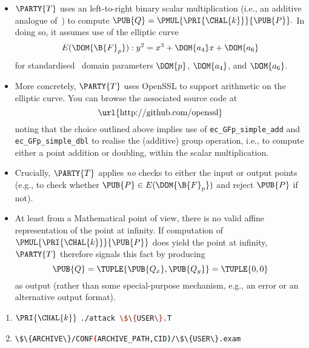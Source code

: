\begin{itemize}
\item $\PARTY{T}$ 
      uses an left-to-right binary scalar multiplication
      (i.e., an additive analogue of~\cite[Section 2.1]{SCALE:Gordon:85}) 
      to compute 
      $
      \PUB{Q} = \PMUL{\PRI{\CHAL{k}}}{\PUB{P}} .
      $
      In doing so, it assumes use of the
       elliptic curve
      \[
      E( \DOM{\B{F}_p} ) : y^2 = x^3 + \DOM{a_4} x + \DOM{a_6}
      \]
      for standardised~\cite{SCALE:FIPS:186:00} domain parameters 
      $\DOM{p}$, 
      $\DOM{a_4}$, 
      and 
      $\DOM{a_6}$.
\item More concretely, 
      $\PARTY{T}$ 
      uses OpenSSL to support arithmetic on the elliptic curve.  You can 
      browse the associated source code at
      \[
      \mbox{\url{http://github.com/openssl}}
      \]
      noting that the choice outlined above implies use of 
      \lstinline[language={C}]{ec_GFp_simple_add}
      and
      \lstinline[language={C}]{ec_GFp_simple_dbl}
      to realise the (additive) group operation, i.e., to compute either a
      point addition or doubling, within the scalar multiplication.
\item Crucially, 
      $\PARTY{T}$ 
      applies {\em no} checks to either the input or output points (e.g., to check whether $\PUB{P} \in E( \DOM{\B{F}_p} )$ and reject $\PUB{P}$ if not).
\item At least from a Mathematical point of view, there is no valid affine 
      representation of the point at infinity.  If computation of
      $
      \PMUL{\PRI{\CHAL{k}}}{\PUB{P}}
      $
      does yield the point at infinity, 
      $\PARTY{T}$ 
      therefore signals this fact by producing
      \[
      \PUB{Q} = \TUPLE{ \PUB{Q_x}, \PUB{Q_y} } = \TUPLE{ 0, 0 }
      \]
      as output (rather than some special-purpose mechanism, e.g., an error or an alternative output format).
\end{itemize}



\begin{enumerate}
\item \DESCTASKIMPL
      {$\PRI{\CHAL{k}}$}
      {\mbox{\lstinline[language={bash}]|./attack \$\{USER\}.T|}}
\item \DESCTASKEXAM
      {\mbox{\lstinline[language={bash}]|\$\{ARCHIVE\}/CONF(ARCHIVE_PATH,CID)/\$\{USER\}.exam|}}
\end{enumerate}

